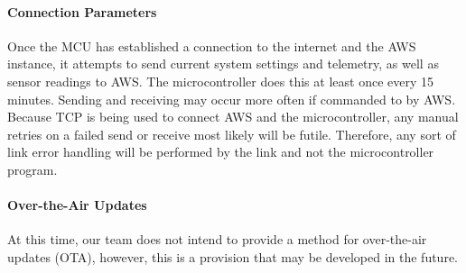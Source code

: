 \paragraph{Connection Parameters}
Once the MCU has established a connection to the internet and the AWS
instance, it attempts to send current system settings and telemetry, as
well as sensor readings to AWS. The microcontroller does this at least
once every 15 minutes. Sending and receiving may occur more often if
commanded to by AWS. Because TCP is being used to connect AWS and the
microcontroller, any manual retries on a failed send or receive most
likely will be futile. Therefore, any sort of link error handling will
be performed by the link and not the microcontroller program.

\paragraph{Over-the-Air Updates}
At this time, our team does not intend to provide a method for over-the-air
updates (OTA), however, this is a provision that may be developed in the
future.

